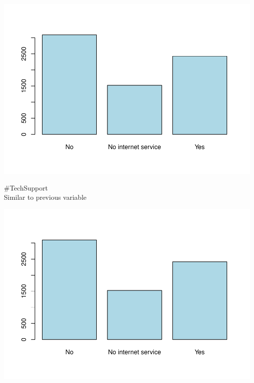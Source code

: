 \documentclass[
]{article}
\newenvironment{Shaded}{\begin{snugshade}}{\end{snugshade}}
\newcommand{\AttributeTok}[1]{\textcolor[rgb]{0.13,0.29,0.53}{#1}}
\newcommand{\CommentTok}[1]{\textcolor[rgb]{0.56,0.35,0.01}{\textit{#1}}}
\newcommand{\FunctionTok}[1]{\textcolor[rgb]{0.13,0.29,0.53}{\textbf{#1}}}
\newcommand{\NormalTok}[1]{#1}
\newcommand{\OtherTok}[1]{\textcolor[rgb]{0.56,0.35,0.01}{#1}}
\newcommand{\SpecialCharTok}[1]{\textcolor[rgb]{0.81,0.36,0.00}{\textbf{#1}}}
\newcommand{\StringTok}[1]{\textcolor[rgb]{0.31,0.60,0.02}{#1}}
\begin{document}
\includegraphics{Assignment2_script_files/figure-latex/unnamed-chunk-16-1.pdf}

\#TechSupport\\
Similar to previous variable

\begin{Shaded}
\end{Shaded}

\includegraphics{Assignment2_script_files/figure-latex/unnamed-chunk-17-1.pdf}
\end{document}
